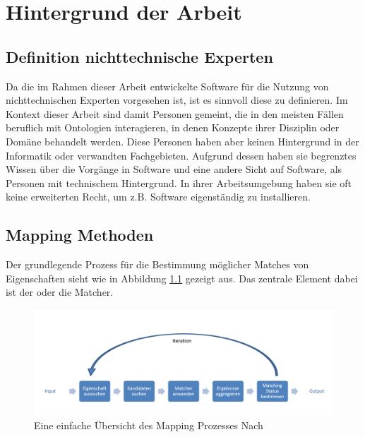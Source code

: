 %
\chapter{Hintergrund der Arbeit}
\label{chap:background}

	\section{Definition nichttechnische Experten}
	Da die im Rahmen dieser Arbeit entwickelte Software für die Nutzung von
	nichttechnischen Experten vorgesehen ist, ist es sinnvoll diese zu definieren.
	Im Kontext dieser Arbeit sind damit Personen gemeint, die in den meisten Fällen
	beruflich mit Ontologien interagieren, in denen Konzepte ihrer Disziplin oder
	Domäne behandelt werden. Diese Personen haben aber keinen Hintergrund in der
	Informatik oder verwandten Fachgebieten. Aufgrund dessen haben sie begrenztes
	Wissen über die Vorgänge in Software und eine andere Sicht auf Software, als
	Personen mit technischem Hintergrund. In ihrer Arbeitsumgebung haben sie oft
	keine erweiterten Recht, um z.B. Software eigenständig zu installieren.

	\section{Mapping Methoden}
	Der grundlegende Prozess für die Bestimmung möglicher Matches von Eigenschaften
	sieht wie in Abbildung \ref{fig1} gezeigt aus. Das zentrale Element dabei ist
	der oder die Matcher. \cite{Hoo14}
	
	\begin{figure}[ht]
	\centering
	\includegraphics[width=1.0\textwidth]{pics/simple-high-level-view-of-a-mapping-process.png}
	\caption{Eine einfache Übersicht des Mapping Prozesses Nach \cite{Hoo14}}
	\label{fig1}
	\end{figure}
	
